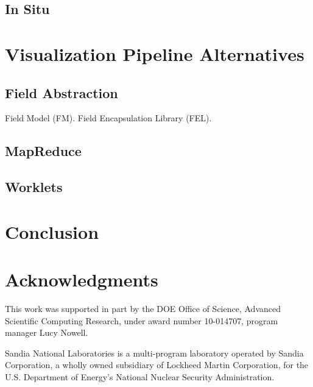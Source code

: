 \documentclass{article}
\begin{document}
\subsection{In Situ}
\label{sec:InSitu}


\section{Visualization Pipeline Alternatives}
\label{sec:Alternatives}

\subsection{Field Abstraction}
\label{sec:FieldAbstraction}

Field Model (FM).  Field Encapsulation Library (FEL).

\subsection{MapReduce}
\label{sec:MapReduce}

\subsection{Worklets}
\label{sec:Worklets}


\section{Conclusion}
\label{sec:Conclusion}


\section{Acknowledgments}

This work was supported in part by the DOE Office of Science, Advanced
Scientific Computing Research, under award number 10-014707, program
manager Lucy Nowell.

Sandia National Laboratories is a multi-program laboratory operated by
Sandia Corporation, a wholly owned subsidiary of Lockheed Martin
Corporation, for the U.S. Department of Energy's National Nuclear Security
Administration.



\end{document}
